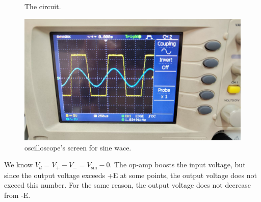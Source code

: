 \documentclass[11pt]{article}
\newcommand{\PicScale}{0.2}
\begin{document}
\begin{question}
\begin{subquestion}
{\begin{figure}[H]
                \caption{The circuit.}
            \end{figure}
            \begin{figure}[H]
                \centering
                \includegraphics[scale=\PicScale,angle=0]{Fig/4.jpeg}
                \caption{oscilloscope's screen for sine wace.}
            \end{figure}
            We know $V_d = V_+ - V_- = V_{\sin} - 0$.
            The op-amp boosts the input voltage, but since the output voltage exceeds +E at some points, the output voltage does not exceed this number. For the same reason, the output voltage does not decrease from -E.
        }
    \end{subquestion}


\end{question}
\end{document}
